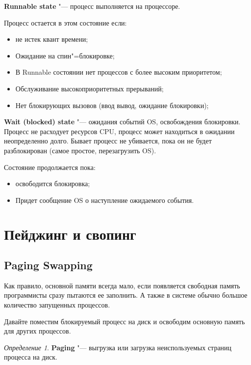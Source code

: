 \documentclass[bachelor, och, book]{SCWorks}
\theoremstyle{remark}
\newtheorem{definition}{Определение}
\begin{document}
    \hfill \break
    \textbf{Runnable state} "--- процесс выполняется на процессоре.

    Процесс остается в этом состояние если:

    \begin{itemize}[label=$\bullet$]
        \item не истек квант времени;
        \item Ожидание на спин"=блокировке;
        \item В Runnable состоянии нет процессов с более высоким приоритетом;
        \item Обслуживание высокоприоритетных прерываний;
        \item Нет блокирующих вызовов (ввод вывод, ожидание блокировки);
    \end{itemize}


    \hfill \break
    \textbf{Wait (blocked) state} "--- ожидания событий OS, освобождения блокировки. Процесс не расходует ресурсов CPU, процесс может находиться в ожидании неопределенно долго. Бывает процесс не убивается, пока он не будет разблокирован (самое простое, перезагрузить OS).

    Состояние продолжается пока:

    \begin{itemize}[label=$\bullet$]
        \item освободится блокировка;
        \item Придет сообщение OS о наступление ожидаемого события.
    \end{itemize}

    \section{Пейджинг и свопинг}
    
    \subsection{Paging Swapping}

    Как правило, основной памяти всегда мало, если появляется свободная память программисты сразу пытаются ее заполнить. А также в системе обычно большое количество запущенных процессов. 

    Давайте поместим блокируемый процесс на диск и освободим основную память для других процессов.

    \begin{definition}
        \textbf{Paging} "--- выгрузка или загрузка неиспользуемых страниц процесса на диск.
    \end{definition}
\end{document}
